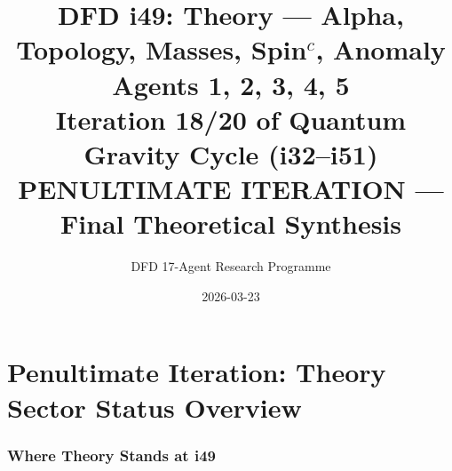 \documentclass[11pt,a4paper]{article}
\title{DFD i49: Theory --- Alpha, Topology, Masses, Spin$^c$, Anomaly\\[6pt]
\large Agents 1, 2, 3, 4, 5\\[6pt]
\normalsize Iteration 18/20 of Quantum Gravity Cycle (i32--i51)\\[6pt]
\textbf{PENULTIMATE ITERATION --- Final Theoretical Synthesis}}
\author{DFD 17-Agent Research Programme}
\date{2026-03-23}
\begin{document}
\maketitle
\tableofcontents
\newpage

\part{Penultimate Iteration: Theory Sector Status Overview}
\label{part:overview}

\section{Where Theory Stands at i49}
\end{document}
